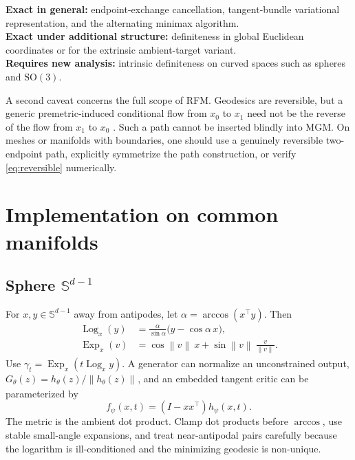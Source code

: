 \documentclass[10pt,twocolumn]{article}
\newcommand{\Exp}{\operatorname{Exp}}
\newcommand{\Log}{\operatorname{Log}}
\newcommand{\norm}[2][]{\left\lVert #2\right\rVert_{#1}}
\begin{document}
\begin{statusbox}
\textbf{Exact in general:} endpoint-exchange cancellation, tangent-bundle variational representation, and the alternating minimax algorithm.\\
\textbf{Exact under additional structure:} definiteness in global Euclidean coordinates or for the extrinsic ambient-target variant.\\
\textbf{Requires new analysis:} intrinsic definiteness on curved spaces such as spheres and $\mathrm{SO}(3)$.
\end{statusbox}

A second caveat concerns the full scope of RFM. Geodesics are reversible, but a generic premetric-induced conditional flow from $x_0$ to $x_1$ need not be the reverse of the flow from $x_1$ to $x_0$ \citep{chen2024general}. Such a path cannot be inserted blindly into MGM. On meshes or manifolds with boundaries, one should use a genuinely reversible two-endpoint path, explicitly symmetrize the path construction, or verify \cref{eq:reversible} numerically.

\section{Implementation on common manifolds}

\subsection{Sphere \texorpdfstring{$\mathbb S^{d-1}$}{S(d-1)}}

For $x,y\in\mathbb S^{d-1}$ away from antipodes, let $\alpha=\arccos(x^\top y)$. Then
\begin{align}
 \Log_x(y)&=\frac{\alpha}{\sin\alpha}\bigl(y-\cos\alpha\,x\bigr),\\
 \Exp_x(v)&=\cos\norm{v}\,x+\sin\norm{v}\,\frac{v}{\norm{v}}.
\end{align}
Use $\gamma_t=\Exp_x(t\Log_x y)$. A generator can normalize an unconstrained output,
$G_\theta(z)=h_\theta(z)/\norm{h_\theta(z)}$, and an embedded tangent critic can be parameterized by
\begin{equation}
 f_\psi(x,t)=(I-xx^\top)h_\psi(x,t).
\end{equation}
The metric is the ambient dot product. Clamp dot products before $\arccos$, use stable small-angle expansions, and treat near-antipodal pairs carefully because the logarithm is ill-conditioned and the minimizing geodesic is non-unique.
\end{document}
